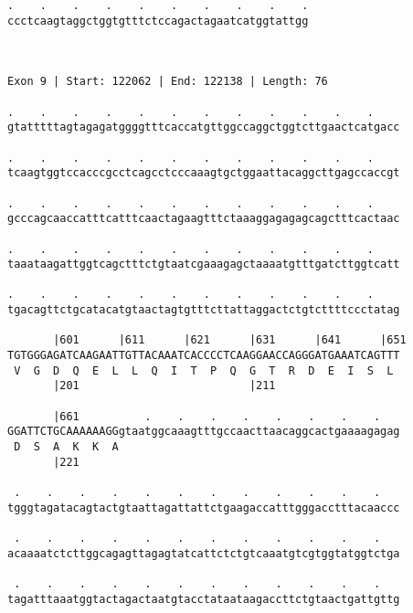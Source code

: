 \documentclass{article}
\begin{document}
\begin{Verbatim}
.    .    .    .    .    .    .    .    .    .
ccctcaagtaggctggtgtttctccagactagaatcatggtattgg
                                              
                                              
 
Exon 9 | Start: 122062 | End: 122138 | Length: 76
 
.    .    .    .    .    .    .    .    .    .    .    .    
gtatttttagtagagatggggtttcaccatgttggccaggctggtcttgaactcatgacc
                                                            
.    .    .    .    .    .    .    .    .    .    .    .    
tcaagtggtccacccgcctcagcctcccaaagtgctggaattacaggcttgagccaccgt
                                                            
.    .    .    .    .    .    .    .    .    .    .    .    
gcccagcaaccatttcatttcaactagaagtttctaaaggagagagcagctttcactaac
                                                            
.    .    .    .    .    .    .    .    .    .    .    .    
taaataagattggtcagctttctgtaatcgaaagagctaaaatgtttgatcttggtcatt
                                                            
.    .    .    .    .    .    .    .    .    .    .    .    
tgacagttctgcatacatgtaactagtgtttcttattaggactctgtcttttccctatag
                                                            
       |601      |611      |621      |631      |641      |651
TGTGGGAGATCAAGAATTGTTACAAATCACCCCTCAAGGAACCAGGGATGAAATCAGTTT
 V  G  D  Q  E  L  L  Q  I  T  P  Q  G  T  R  D  E  I  S  L 
       |201                          |211                   
  
       |661          .    .    .    .    .    .    .    .   
GGATTCTGCAAAAAAGGgtaatggcaaagtttgccaacttaacaggcactgaaaagagag
 D  S  A  K  K  A                                           
       |221                                                 
  
 .    .    .    .    .    .    .    .    .    .    .    .   
tgggtagatacagtactgtaattagattattctgaagaccatttgggacctttacaaccc
                                                            
 .    .    .    .    .    .    .    .    .    .    .    .   
acaaaatctcttggcagagttagagtatcattctctgtcaaatgtcgtggtatggtctga
                                                            
 .    .    .    .    .    .    .    .    .    .    .    .   
tagatttaaatggtactagactaatgtacctataataagaccttctgtaactgattgttg
                                                            

\end{Verbatim}
\end{document}
